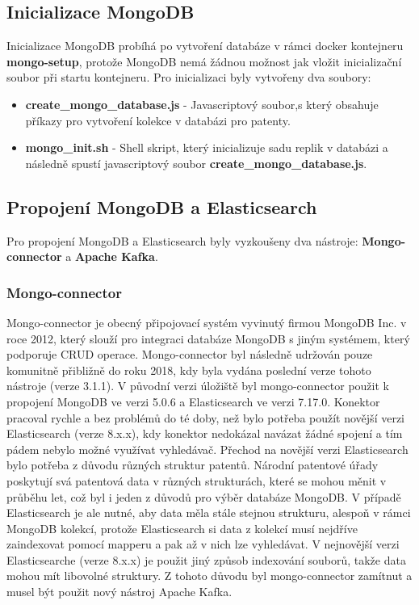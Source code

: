 \subsection{Inicializace MongoDB}
Inicializace MongoDB probíhá po vytvoření databáze v rámci docker kontejneru \textbf{mongo-setup}, protože MongoDB nemá žádnou možnost jak vložit inicializační soubor při startu kontejneru. Pro inicializaci byly vytvořeny dva soubory:
\begin{itemize}
\item \textbf{create\_mongo\_database.js} - Javascriptový soubor,s který obsahuje příkazy pro vytvoření kolekce v databázi pro patenty.
\item \textbf{mongo\_init.sh} - Shell skript, který inicializuje sadu replik v databázi a následně spustí javascriptový soubor \textbf{create\_mongo\_database.js}.
\end{itemize}

\subsection{Propojení MongoDB a Elasticsearch}
Pro propojení MongoDB a Elasticsearch byly vyzkoušeny dva nástroje: \textbf{Mongo-connector} a \textbf{Apache Kafka}. 

\subsubsection{Mongo-connector}
Mongo-connector je obecný připojovací systém vyvinutý firmou MongoDB Inc. v roce 2012, který slouží pro integraci databáze MongoDB s jiným systémem, který podporuje \gls{CRUD} operace. Mongo-connector byl následně udržován pouze komunitně přibližně do roku 2018, kdy byla vydána poslední verze tohoto nástroje (verze 3.1.1).
\newline
\indent V původní verzi úložiště byl mongo-connector použit k propojení MongoDB ve verzi 5.0.6 a Elasticsearch ve verzi 7.17.0. Konektor pracoval rychle a bez problémů do té doby, než bylo potřeba použít novější verzi Elasticsearch (verze 8.x.x), kdy konektor nedokázal navázat žádné spojení a tím pádem nebylo možné využívat vyhledávač.
\newline
\indent Přechod na novější verzi Elasticsearch bylo potřeba z důvodu různých struktur patentů. Národní patentové úřady poskytují svá patentová data v různých strukturách, které se mohou měnit v průběhu let, což byl i jeden z důvodů pro výběr databáze MongoDB. V případě Elasticsearch je ale nutné, aby data měla stále stejnou strukturu, alespoň v rámci MongoDB kolekcí, protože Elasticsearch si data z kolekcí musí nejdříve zaindexovat pomocí mapperu a pak až v nich lze vyhledávat. V nejnovější verzi Elasticsearche (verze 8.x.x) je použit jiný způsob indexování souborů, takže data mohou mít libovolné struktury. Z tohoto důvodu byl mongo-connector zamítnut a musel být použit nový nástroj Apache Kafka.

